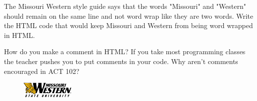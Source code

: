 \documentclass[letterpaper,12pt]{exam}
\begin{document}
\begin{questions}
\begin{samepage}
\question The Missouri Western style guide says that the words "Missouri" and "Western" should remain on the same line and not word wrap like they are two words.  Write the HTML code that would keep Missouri and Western from being word wrapped in HTML. 
\vspace{15mm}
\end{samepage}

\begin{samepage}
\question How do you make a comment in HTML?  If you take most programming classes the teacher pushes you to put comments in your code. Why aren't comments encouraged in ACT 102? 
\vspace{15mm}
\end{samepage}

\end{questions}

\begin{figure}[b]\label{end}
	\center
	\includegraphics[width=1in]{tux}
\end{figure}
\end{document}
